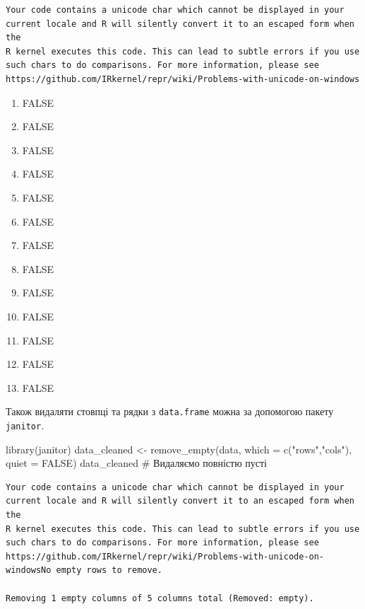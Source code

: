 \documentclass[
  letterpaper,
  DIV=11,
  numbers=noendperiod]{scrreprt}
\newenvironment{Shaded}{\begin{snugshade}}{\end{snugshade}}
\newcommand{\AttributeTok}[1]{\textcolor[rgb]{0.40,0.45,0.13}{#1}}
\newcommand{\CommentTok}[1]{\textcolor[rgb]{0.37,0.37,0.37}{#1}}
\newcommand{\ConstantTok}[1]{\textcolor[rgb]{0.56,0.35,0.01}{#1}}
\newcommand{\FunctionTok}[1]{\textcolor[rgb]{0.28,0.35,0.67}{#1}}
\newcommand{\NormalTok}[1]{\textcolor[rgb]{0.00,0.23,0.31}{#1}}
\newcommand{\OtherTok}[1]{\textcolor[rgb]{0.00,0.23,0.31}{#1}}
\newcommand{\StringTok}[1]{\textcolor[rgb]{0.13,0.47,0.30}{#1}}
\providecommand{\tightlist}{%
  \setlength{\itemsep}{0pt}\setlength{\parskip}{0pt}}\usepackage{longtable,booktabs,array}
\begin{document}
\begin{verbatim}
Your code contains a unicode char which cannot be displayed in your
current locale and R will silently convert it to an escaped form when the
R kernel executes this code. This can lead to subtle errors if you use
such chars to do comparisons. For more information, please see
https://github.com/IRkernel/repr/wiki/Problems-with-unicode-on-windows
\end{verbatim}

\begin{enumerate}
\def\labelenumi{\arabic{enumi}.}
\tightlist
\item
  FALSE
\item
  FALSE
\item
  FALSE
\item
  FALSE
\item
  FALSE
\item
  FALSE
\item
  FALSE
\item
  FALSE
\item
  FALSE
\item
  FALSE
\item
  FALSE
\item
  FALSE
\item
  FALSE
\end{enumerate}

Також видаляти стовпці та рядки з \texttt{data.frame} можна за допомогою
пакету \texttt{janitor}.

\begin{Shaded}
\begin{Highlighting}[]
\FunctionTok{library}\NormalTok{(janitor)}
\NormalTok{data\_cleaned }\OtherTok{\textless{}{-}} \FunctionTok{remove\_empty}\NormalTok{(data, }\AttributeTok{which =} \FunctionTok{c}\NormalTok{(}\StringTok{"rows"}\NormalTok{,}\StringTok{"cols"}\NormalTok{), }\AttributeTok{quiet =} \ConstantTok{FALSE}\NormalTok{)}
\NormalTok{data\_cleaned}
\CommentTok{\# Видаляємо повністю пусті}
\end{Highlighting}
\end{Shaded}

\begin{verbatim}
Your code contains a unicode char which cannot be displayed in your
current locale and R will silently convert it to an escaped form when the
R kernel executes this code. This can lead to subtle errors if you use
such chars to do comparisons. For more information, please see
https://github.com/IRkernel/repr/wiki/Problems-with-unicode-on-windowsNo empty rows to remove.

Removing 1 empty columns of 5 columns total (Removed: empty).
\end{verbatim}
\end{document}
